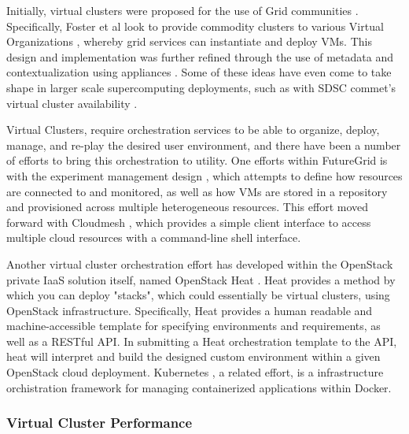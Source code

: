 Initially, virtual clusters were proposed for the use of Grid communities \cite{Foster2006}. Specifically, Foster et al look to provide commodity clusters to various Virtual Organizations \cite{foster2001}, whereby grid services can instantiate and deploy VMs. This design and implementation was further refined through the use of metadata and contextualization using appliances \cite{keahey2008contextualization}. Some of these ideas have even come to take shape in larger scale supercomputing deployments, such as with SDSC commet's virtual cluster availability \cite{Moore2014}.

Virtual Clusters, require orchestration services to be able to organize, deploy, manage, and re-play the desired user environment, and there have been a number of efforts to bring this orchestration to utility. One efforts within FutureGrid is with the experiment management design \cite{las2010gce}, which attempts to define how resources are connected to and monitored, as well as how VMs are stored in a repository and provisioned across multiple heterogeneous resources. This effort moved forward with  Cloudmesh \cite{von2014cloudmesh}, which provides a simple client interface to access multiple cloud resources with a command-line shell interface. 

Another virtual cluster orchestration effort has developed within the OpenStack private IaaS solution itself, named OpenStack Heat \cite{www-openstack-heat}. Heat provides a method by which you can deploy "stacks", which could essentially be virtual clusters,  using OpenStack infrastructure. Specifically, Heat provides a human readable and machine-accessible template for specifying environments and requirements, as well as a RESTful API. In submitting a Heat orchestration template to the API, heat will interpret and build the designed custom environment within a given OpenStack cloud deployment. Kubernetes \cite{bernstein2014containers}, a related effort, is a infrastructure orchistration framework for managing containerized applications within Docker.  




\subsubsection{Virtual Cluster Performance}

